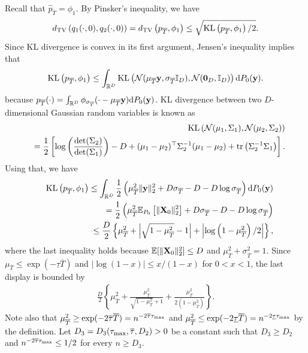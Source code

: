 \documentclass[twoside,11pt]{article}
\def\cN{\mathcal N}
\newcommand{\bX}{{\bf X}}
\newcommand{\by}{{\bf y}}
\newcommand{\bbE}{{\mathbb E}}
\newcommand{\bbI}{{\mathbb I}}
\newcommand{\bbR}{{\mathbb R}}
\newcommand{\be}{\begin{equation}}
\newcommand{\ee}{\end{equation}}
\newcommand{\bean}{\setlength\arraycolsep{1pt}\begin{eqnarray*}}
\newcommand{\eean}{\end{eqnarray*}}
\def\d{{\rm d}}
\begin{document}
Recall that $\widehat p_{\overline{T}} = \phi_1$. By Pinsker's inequality, we have
\be
d_{\rm TV} \left( q_{1}(\cdot, 0),  q_{2}(\cdot, 0)  \right) 
= d_{\rm TV} \left( p_{\overline{T}}, \phi_1 \right) 
\leq \sqrt{  \text{KL} \left( p_{\overline{T}}, \phi_{1} \right) / 2 }.
\label{eqthm2:thiineq}
\ee
Since KL divergence is convex in its first argument, Jensen's inequality implies that
\bean
 \text{KL} \left( p_{\overline{T}}, \phi_{1} \right) \leq  \int_{\bbR^{D}}  \text{KL} \left( \cN(\mu_{\overline{T}} \by, \sigma_{\overline{T}} \bbI_{D}) , \cN(\mathbf{0}_{D}, \bbI_{D}) \right) \d P_0(\by).
\eean
because $p_{\overline{T}}(\cdot) = \int_{\bbR^{D}} \phi_{\sigma_{\overline{T}}}(\cdot - \mu_{\overline{T}} \by) \d P_{0}(\by)$.
KL divergence between two $D$-dimensional Gaussian random variables is known as
\bean
&& \text{KL} \left( \cN(\mu_1, \Sigma_1)   , \cN(\mu_2, \Sigma_2) \right)
 \\
&& = \frac{1}{2} \left[ \log \left( \frac{ \det(\Sigma_{2}) }{\det(\Sigma_{1})} \right) - D + (\mu_1 - \mu_2)^{\top} \Sigma_{2}^{-1}  (\mu_1-\mu_2) + {\rm tr}\left( \Sigma_2^{-1} \Sigma_1 \right) \right].
\eean
Using that, we have
\bean
&&  \text{KL} \left( p_{\overline{T}}, \phi_{1} \right)
\leq \int_{\bbR^{D}} \frac{1}{2} \left( \mu_{\overline{T}}^2 \| \by \|_2^2 + D \sigma_{\overline{T}} - D - D \log \sigma_{\overline{T}}  \right) \d P_{0}(\by)
\\
&& = \frac{1}{2} \left( \mu_{\overline{T}}^2 \bbE_{P_0} \left[ \| \bX_{0} \|_2^2 \right]   + D \sigma_{\overline{T}} - D - D \log \sigma_{\overline{T}}  \right)
\\
&& \leq \frac{D}{2} \left\{ \mu_{\overline{T}}^2 + \left\vert \sqrt{1 - \mu_{\overline{T}}^2} -1 \right\vert + \left\vert \log \left(1 - \mu_{\overline{T}}^2 \right) / 2 \right\vert  \right\},
\eean
where the last inequality holds because $\bbE [ \| \bX_{0} \|_2^2 ] \leq D$ and $\mu_{\overline{T}}^2 + \sigma_{\overline{T}}^2 = 1$.
Since $\mu_{\overline{T}} \leq \exp(-\underline{\tau} \overline{T})$ and $ \vert \log (1-x) \vert \leq x/(1-x)$ for $ 0 < x < 1$, the last display is bounded by
\bean
\frac{D}{2} \left\{ \mu_{\overline{T}}^2 + \frac{\mu_{\overline{T}}^2}{\sqrt{1-\mu_{\overline{T}}^2} + 1} + \frac{ \mu_{\overline{T}}^2}{2 ( 1 - \mu_{\overline{T}}^2  ) }    \right\}.
\eean
Note also that $\mu_{\overline{T}}^2 \geq \exp ( - 2 \overline{\tau} \overline{T}  ) =  n^{- 2 \overline{\tau} \tau_{\rm max} }$ and $ \mu_{\overline{T}}^2 \leq \exp ( - 2 \underline{\tau} \overline{T}  ) = n^{ - 2 \underline{\tau} \tau_{\rm max}} $ by the definition. 
Let $D_{3} = D_{3} ( \tau_{\rm max}, \overline{\tau}, D_{2} ) > 0$ be a constant such that $D_{3} \geq D_{2} $ and $n^{- 2 \overline{\tau} \tau_{\rm max} } \leq 1/2 $ for every $n \geq D_{3}$.
\end{document}
